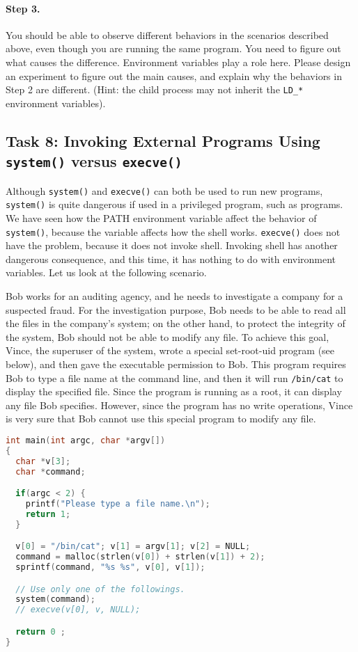 \paragraph{Step 3.}
You should be able to observe different behaviors in the scenarios
described above, even though you are running the same program.  You need
to figure out what causes the difference. Environment variables
play a role here. Please design an experiment to figure out the
main causes, and explain why the behaviors in Step 2 are
different. (Hint: the child process
may not inherit the {\tt LD\_*} environment variables).



\subsection{Task 8: Invoking External Programs Using {\tt system()} versus {\tt execve()}}

Although {\tt system()} and {\tt execve()} can both be used to run new
programs, {\tt system()} is quite dangerous if used in a privileged
program, such as \setuid programs. We have seen how the PATH environment
variable affect the behavior of {\tt system()}, because the variable
affects how the shell works. {\tt execve()} does not have the problem,
because it does not invoke shell. Invoking shell has another dangerous
consequence, and this time, it has nothing to do with environment
variables.  Let us look at the following scenario.


Bob works for an auditing agency, and he needs to investigate a company for a suspected
fraud. For the investigation purpose, Bob needs to be able to read
all the files in the
company's \unix system; on the other hand, to protect the integrity of the system,
Bob should not be able to modify any file.
To achieve this goal, Vince, the superuser of the system,
wrote a special set-root-uid program (see
below), and then gave the executable permission to Bob. This program requires
Bob to type a file name at the command line, and then it will
run {\tt /bin/cat} to display the specified file. Since the program is running
as a root, it can display any file Bob specifies. However, since the program
has no write operations, Vince is very sure that Bob cannot use this special program
to modify any file.

\begin{lstlisting}[language=C, caption=\texttt{catall.c}]
int main(int argc, char *argv[])
{
  char *v[3];
  char *command;

  if(argc < 2) {
    printf("Please type a file name.\n");
    return 1;
  }

  v[0] = "/bin/cat"; v[1] = argv[1]; v[2] = NULL;
  command = malloc(strlen(v[0]) + strlen(v[1]) + 2);
  sprintf(command, "%s %s", v[0], v[1]);

  // Use only one of the followings.
  system(command);
  // execve(v[0], v, NULL);

  return 0 ;
}
\end{lstlisting}


